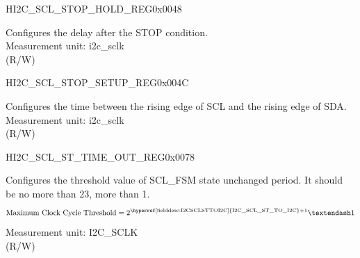 \begin{register}{H}{I2C\_SCL\_STOP\_HOLD\_REG}{0x0048}\label{regdesc:I2CSCLSTOPHOLDREG}
%
%
\regnewline%
\begin{regdesc}\begin{reglist}
\label{fielddesc:I2CSCLSTOPHOLDTIME}\item [I2C\_SCL\_STOP\_HOLD\_TIME] Configures the delay after the STOP condition.\\
Measurement unit: i2c\_sclk \\ (R/W)
\end{reglist}\end{regdesc}
\end{register}


\begin{register}{H}{I2C\_SCL\_STOP\_SETUP\_REG}{0x004C}\label{regdesc:I2CSCLSTOPSETUPREG}
%
%
\regnewline%
\begin{regdesc}\begin{reglist}
\label{fielddesc:I2CSCLSTOPSETUPTIME}\item [I2C\_SCL\_STOP\_SETUP\_TIME] Configures the time between the rising edge of SCL and the rising edge of SDA.\\
Measurement unit: i2c\_sclk \\ (R/W)
\end{reglist}\end{regdesc}
\end{register}


\begin{register}{H}{I2C\_SCL\_ST\_TIME\_OUT\_REG}{0x0078}\label{regdesc:I2CSCLSTTIMEOUTREG}
%
%
\regnewline%
\begin{regdesc}\begin{reglist}
\label{fielddesc:I2CSCLSTTOI2C}\item [I2C\_SCL\_ST\_TO\_I2C] Configures the threshold value of SCL\_FSM state unchanged period. It should be no more than 23, more than 1.\\
\[
\text{Maximum Clock Cycle Threshold} = 2^{\text{\hyperref[fielddesc:I2CSCLSTTOI2C]{I2C\_SCL\_ST\_TO\_I2C}} + 1}–1
\]
Measurement unit: I2C\_SCLK \\ (R/W)
\end{reglist}\end{regdesc}
\end{register}


